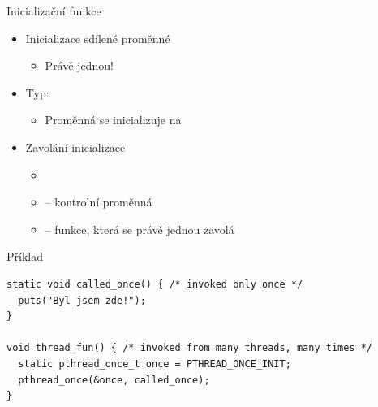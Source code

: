 \begin{frame}[fragile]{Inicializační funkce}

  \begin{itemize}
    \item Inicializace sdílené proměnné
    \begin{itemize}
      \item Právě jednou!
    \end{itemize}

    \pause

    \item Typ: 
    \begin{itemize}
      \item Proměnná se inicializuje na 
    \end{itemize}

    \pause

    \item Zavolání inicializace
    \begin{itemize}
      \item {} \\
      \item {} -- kontrolní proměnná
      \item {} -- funkce, která se právě jednou zavolá
    \end{itemize}
  \end{itemize}

  \begin{block}{Příklad}
  \begin{lstlisting}[aboveskip=2pt,belowskip=2pt]
static void called_once() { /* invoked only once */
  puts("Byl jsem zde!");
}

void thread_fun() { /* invoked from many threads, many times */
  static pthread_once_t once = PTHREAD_ONCE_INIT;
  pthread_once(&once, called_once);
}
  \end{lstlisting}
  \end{block}

\end{frame}

